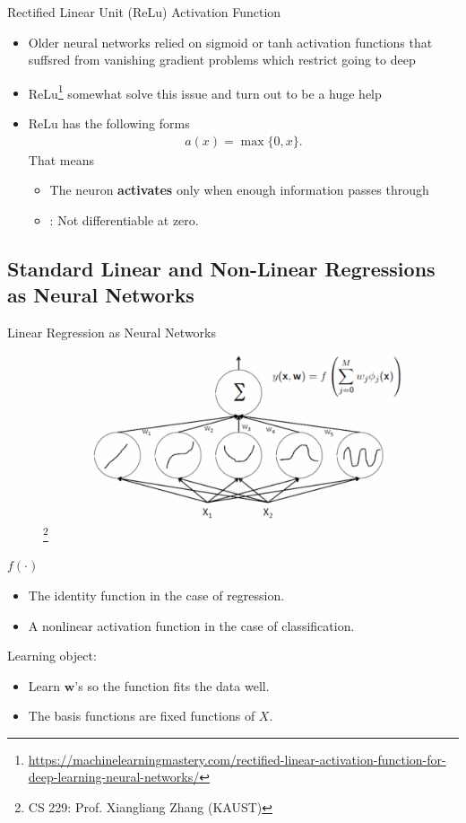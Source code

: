 \documentclass[10pt, hyperref={colorlinks = true,linkcolor = blue}]{beamer}
\begin{document}
{{{\begin{frame}{Rectified Linear Unit (ReLu) Activation Function}
\begin{itemize}
\item Older neural networks relied on sigmoid or tanh activation functions that suffsred from vanishing gradient problems which restrict going to deep
\item ReLu\footnote{\url{https://machinelearningmastery.com/rectified-linear-activation-function-for-deep-learning-neural-networks/}} somewhat solve this issue and turn out to be a huge help
\item ReLu has the following forms
\begin{align*}
a(x) =\max\{0, x\}.
\end{align*}
That means
\begin{itemize}
\item The neuron \textbf{activates} only when enough information passes through
\item {\color{red}{One drawbacks}}: Not differentiable at zero.
\end{itemize}
\end{itemize}
\end{frame}
}
{\subsection{Standard Linear and Non-Linear Regressions as Neural Networks}
\begin{frame}{Linear Regression as Neural Networks}
 \begin{figure}
 \includegraphics[width=0.7\linewidth]{figures/NN-LM.pdf}\footnote{CS 229: Prof. Xiangliang Zhang (KAUST)}
 \end{figure}
 \vspace{-1cm}
 $f(\cdot)$
 \begin{itemize}
\item The identity function in the case of regression.
\item A nonlinear activation function in the case of classification.
\end{itemize}
Learning object: 
\begin{itemize}
\item Learn $\bm w$'s so the function fits the data well.
\item The basis functions are fixed functions of $X$.
 \end{itemize}
\end{frame}



}}}
\end{document}
